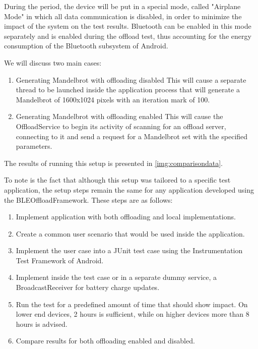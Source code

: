 During the period, the device will be put in a special mode, called "Airplane Mode" in which all data communication is disabled, in order to minimize the impact of the system on the test results. Bluetooth can be enabled in this mode separately and is enabled during the offload test, thus accounting for the energy consumption of the Bluetooth subsystem of Android.

We will discuss two main cases:

\begin{enumerate}
\item{Generating Mandelbrot with offloading disabled}
	This will cause a separate thread to be launched inside the application process that will generate a Mandelbrot of 1600x1024 pixels with an iteration mark of 100.
\item{Generating Mandelbrot with offloading enabled}
	This will cause the OffloadService to begin its activity of scanning for an offload server, connecting to it and send a request for a Mandelbrot set with the specified parameters.
\end{enumerate}

The results of running this setup is presented in \ref{img:comparisondata}. 

To note is the fact that although this setup was tailored to a specific test application, the setup steps remain the same for any application developed using the BLEOffloadFramework. These steps are as follows:

\begin{enumerate}
\item{Implement application with both offloading and local implementations.}

\item{Create a common user scenario that would be used inside the application.}

\item{Implement the user case into a JUnit test case using the Instrumentation Test Framework of Android.}

\item{Implement inside the test case or in a separate dummy service, a BroadcastReceiver for battery charge updates.}

\item{Run the test for a predefined amount of time that should show impact. On lower end devices, 2 hours is sufficient, while on higher devices more than 8 hours is advised.}

\item{Compare results for both offloading enabled and disabled.}
\end{enumerate}


